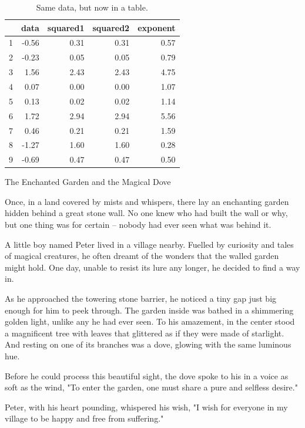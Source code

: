 \documentclass[10pt, a4paper, titlepage]{article}
\begin{document}
\begin{table}[ht]
\caption {Same data, but now in a table.}
\centering
\begin{tabular}{rrrrr}
  \hline
 & data & squared1 & squared2 & exponent \\ 
  \hline
1 & -0.56 & 0.31 & 0.31 & 0.57 \\ 
  2 & -0.23 & 0.05 & 0.05 & 0.79 \\ 
  3 & 1.56 & 2.43 & 2.43 & 4.75 \\ 
  4 & 0.07 & 0.00 & 0.00 & 1.07 \\ 
  5 & 0.13 & 0.02 & 0.02 & 1.14 \\ 
  6 & 1.72 & 2.94 & 2.94 & 5.56 \\ 
  7 & 0.46 & 0.21 & 0.21 & 1.59 \\ 
  8 & -1.27 & 1.60 & 1.60 & 0.28 \\ 
  9 & -0.69 & 0.47 & 0.47 & 0.50 \\ 
   \hline
\end{tabular}

\end{table}

\newpage
\restoregeometry
The Enchanted Garden and the Magical Dove

Once, in a land covered by mists and whispers, there lay an enchanting garden hidden behind a great stone wall. No one knew who had built the wall or why, but one thing was for certain – nobody had ever seen what was behind it.

A little boy named Peter lived in a village nearby. Fuelled by curiosity and tales of magical creatures, he often dreamt of the wonders that the walled garden might hold. One day, unable to resist its lure any longer, he decided to find a way in.

As he approached the towering stone barrier, he noticed a tiny gap just big enough for him to peek through. The garden inside was bathed in a shimmering golden light, unlike any he had ever seen. To his amazement, in the center stood a magnificent tree with leaves that glittered as if they were made of starlight. And resting on one of its branches was a dove, glowing with the same luminous hue.

Before he could process this beautiful sight, the dove spoke to his in a voice as soft as the wind, "To enter the garden, one must share a pure and selfless desire."

Peter, with his heart pounding, whispered his wish, "I wish for everyone in my village to be happy and free from suffering."
\end{document}
